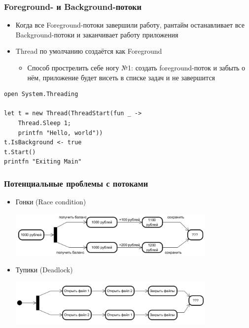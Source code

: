 \documentclass[xetex,mathserif,serif]{beamer}
\begin{document}
	\begin{frame}[fragile]
		\frametitle{Foreground- и Background-потоки}
		\begin{itemize}
			\item Когда все Foreground-потоки завершили работу, рантайм останавливает все Background-потоки и заканчивает работу приложения
			\item Thread по умолчанию создаётся как Foreground
			\begin{itemize}
				\item Способ прострелить себе ногу №1: создать foreground-поток и забыть о нём, приложение будет висеть в списке задач и не завершится
			\end{itemize}
		\end{itemize}
		\begin{verbatim}
open System.Threading

let t = new Thread(ThreadStart(fun _ -> 
    Thread.Sleep 1; 
    printfn "Hello, world"))
t.IsBackground <- true
t.Start()
printfn "Exiting Main"
		\end{verbatim}
	\end{frame}

	\begin{frame}
		\frametitle{Потенциальные проблемы с потоками}
		\begin{itemize}
			\item Гонки (Race condition)
				\begin{center}
					\includegraphics[width=0.8\textwidth]{raceCondition.png}
				\end{center}
				\vspace{1cm}
			\item Тупики (Deadlock)
				\begin{center}
					\includegraphics[width=0.8\textwidth]{deadlock.png}
				\end{center}
		\end{itemize}
	\end{frame}
\end{document}

